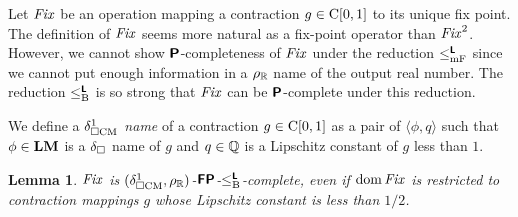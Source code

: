 \documentclass{article}
\newtheorem{lemma}[theorem]{Lemma}
\theoremstyle{definition}
\theoremstyle{remark}
\begin{document}
Let $\mathit{Fix}$ be an operation mapping a contraction $g \in \mathrm C[0,1]$ 
to its unique fix point.
The definition of $\mathit{Fix}$ seems more natural as a fix-point operator than
$\mathit{Fix}^2$.
However, we cannot show $\text{\bfseries \sffamily \upshape P}$-completeness of $\mathit{Fix}$ 
under the reduction $\leq _{\mathrm{mF}} ^{\text{\bfseries \sffamily \upshape L}}$ since we cannot put enough information in
 a $\rho _\mathbb R$ name of the output real number.
The reduction $\leq _{\mathrm B} ^{\text{\bfseries \sffamily \upshape L}}$ is so strong that $\mathit{Fix}$ can 
be $\text{\bfseries \sffamily \upshape P}$-complete under this reduction.

We define a \emph{$\delta _{\square \mathrm{CM}}^1$ name} of a contraction $g \in \mathrm C[0,1]$
as a pair of $\langle \phi, q \rangle$ such that $\phi \in \mathbf{LM}$ is a 
$\delta _\square$ name of $g$ and $q \in \mathbb Q$ is a Lipschitz constant of $g$ less than $1$.
\begin{lemma}
\label{lemma:P-hard-g_u}
$\mathit{Fix}$ is $(\delta _{\square \mathrm{CM}}^1, \rho _\mathbb R)$-$\text{\bfseries \sffamily \upshape FP}$-$\leq _{\mathrm B} ^{\text{\bfseries \sffamily \upshape L}}$-complete, 
 even if $\mathop{\rm dom} \mathit{Fix}$ is restricted to contraction mappings
$g$ whose Lipschitz constant is less than $1/2$.
\end{lemma}
\end{document}
